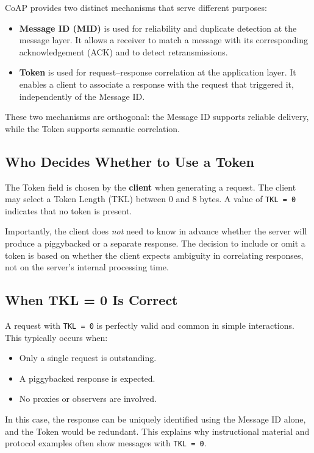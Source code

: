 \documentclass{scrbook}
\begin{document}
CoAP provides two distinct mechanisms that serve different purposes:

\begin{itemize}
    \item \textbf{Message ID (MID)} is used for reliability and duplicate detection at the message layer. It allows a receiver to match a message with its corresponding acknowledgement (ACK) and to detect retransmissions.
    \item \textbf{Token} is used for request--response correlation at the application layer. It enables a client to associate a response with the request that triggered it, independently of the Message ID.
\end{itemize}

These two mechanisms are orthogonal: the Message ID supports reliable delivery, while the Token supports semantic correlation.

\subsection{Who Decides Whether to Use a Token}

The Token field is chosen by the \textbf{client} when generating a request. The client may select a Token Length (TKL) between 0 and 8 bytes. A value of \texttt{TKL = 0} indicates that no token is present.

Importantly, the client does \emph{not} need to know in advance whether the server will produce a piggybacked or a separate response. The decision to include or omit a token is based on whether the client expects ambiguity in correlating responses, not on the server’s internal processing time.

\subsection{When TKL = 0 Is Correct}

A request with \texttt{TKL = 0} is perfectly valid and common in simple interactions. This typically occurs when:

\begin{itemize}
    \item Only a single request is outstanding.
    \item A piggybacked response is expected.
    \item No proxies or observers are involved.
\end{itemize}

In this case, the response can be uniquely identified using the Message ID alone, and the Token would be redundant. This explains why instructional material and protocol examples often show messages with \texttt{TKL = 0}.
\end{document}
